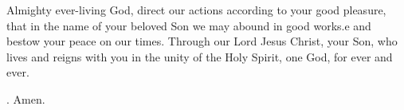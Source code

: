 \lettrine[lines=3]{A}{}lmighty ever-living God,
direct our actions according to your good pleasure,
that in the name of your beloved Son
we may abound in good works.e
and bestow your peace on our times.
Through our Lord Jesus Christ, your Son,
who lives and reigns with you in the unity of the Holy Spirit,
one God, for ever and ever. \par \Rbar. Amen.
